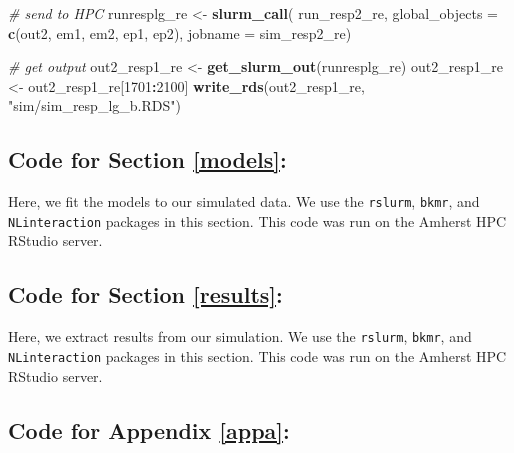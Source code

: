 \documentclass[12pt, twoside]{amherstthesis}
\newenvironment{Shaded}{\begin{snugshade}}{\end{snugshade}}
\newcommand{\AttributeTok}[1]{\textcolor[rgb]{0.13,0.29,0.53}{#1}}
\newcommand{\CommentTok}[1]{\textcolor[rgb]{0.56,0.35,0.01}{\textit{#1}}}
\newcommand{\DecValTok}[1]{\textcolor[rgb]{0.00,0.00,0.81}{#1}}
\newcommand{\FunctionTok}[1]{\textcolor[rgb]{0.13,0.29,0.53}{\textbf{#1}}}
\newcommand{\NormalTok}[1]{#1}
\newcommand{\OtherTok}[1]{\textcolor[rgb]{0.56,0.35,0.01}{#1}}
\newcommand{\SpecialCharTok}[1]{\textcolor[rgb]{0.81,0.36,0.00}{\textbf{#1}}}
\newcommand{\StringTok}[1]{\textcolor[rgb]{0.31,0.60,0.02}{#1}}
\begin{document}
\begin{Shaded}
\begin{Highlighting}[]
\CommentTok{\# send to HPC}
\NormalTok{runresplg\_re }\OtherTok{\textless{}{-}} \FunctionTok{slurm\_call}\NormalTok{(}
\NormalTok{  run\_resp2\_re, }
  \AttributeTok{global\_objects =} \FunctionTok{c}\NormalTok{(}\StringTok{\textquotesingle{}out2\textquotesingle{}}\NormalTok{, }
                     \StringTok{\textquotesingle{}em1\textquotesingle{}}\NormalTok{, }\StringTok{\textquotesingle{}em2\textquotesingle{}}\NormalTok{, }\StringTok{\textquotesingle{}ep1\textquotesingle{}}\NormalTok{, }\StringTok{\textquotesingle{}ep2\textquotesingle{}}\NormalTok{),}
  \AttributeTok{jobname =} \StringTok{\textquotesingle{}sim\_resp2\_re\textquotesingle{}}\NormalTok{)}

\CommentTok{\# get output}
\NormalTok{out2\_resp1\_re }\OtherTok{\textless{}{-}} \FunctionTok{get\_slurm\_out}\NormalTok{(runresplg\_re)}
\NormalTok{out2\_resp1\_re }\OtherTok{\textless{}{-}}\NormalTok{ out2\_resp1\_re[}\DecValTok{1701}\SpecialCharTok{:}\DecValTok{2100}\NormalTok{]}
\FunctionTok{write\_rds}\NormalTok{(out2\_resp1\_re, }\StringTok{"sim/sim\_resp\_lg\_b.RDS"}\NormalTok{)}
\end{Highlighting}
\end{Shaded}
\normalsize

\hypertarget{code-for-section-refmodels}{%
\subsection{Code for Section \ref{models}:}\label{code-for-section-refmodels}}

Here, we fit the models to our simulated data. We use the \texttt{rslurm}, \texttt{bkmr}, and \texttt{NLinteraction} packages in this section. This code was run on the Amherst HPC RStudio server.

\hypertarget{code-for-section-refresults}{%
\subsection{Code for Section \ref{results}:}\label{code-for-section-refresults}}

Here, we extract results from our simulation. We use the \texttt{rslurm}, \texttt{bkmr}, and \texttt{NLinteraction} packages in this section. This code was run on the Amherst HPC RStudio server.

\hypertarget{code-for-appendix-refappa}{%
\subsection{Code for Appendix \ref{appa}:}\label{code-for-appendix-refappa}}
\end{document}
